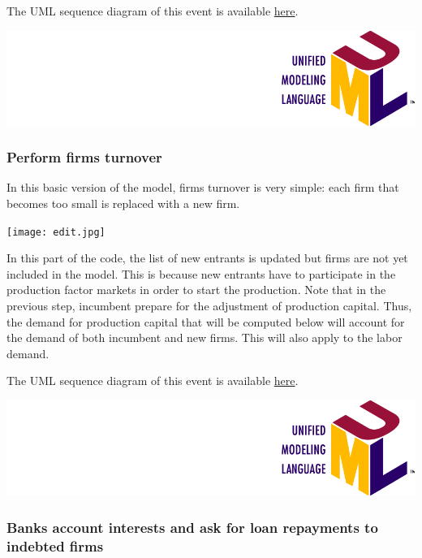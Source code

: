 \documentclass{book}
\newcommand{\doclocation}{file:///Users/giulioni/Documents/workspace/gabriele/docs}
\begin{document}
\vskip3mm



The UML sequence diagram of this event is available \href{\doclocation/umldoc/computeEconomicResultAndCapitalDepreciation.html}{here}.
\begin{marginfigure}
	\includegraphics[scale=0.1]{uml.png}
\end{marginfigure}


\subsubsection{Perform firms turnover}

In this basic version of the model, firms turnover is very simple: each firm that becomes too small is replaced with a new firm.
\begin{marginfigure}
	\hskip2.5cm\texttt{[image: edit.jpg]}
\end{marginfigure}

In this part of the code, the list of new entrants is updated but firms are not yet included in the model. This is because new entrants have to participate in the production factor markets in order to start the production. Note that in the previous step, incumbent prepare for the adjustment of production capital. Thus, the demand for production capital that will be computed below will account for the demand of both incumbent and new firms. This will also apply to the labor demand.

The UML sequence diagram of this event is available \href{\doclocation/umldoc/performFirmsExit.html}{here}.
\begin{marginfigure}
	\includegraphics[scale=0.1]{uml.png}
\end{marginfigure}

\subsubsection{Banks account interests and ask for loan repayments to indebted firms}
\end{document}
